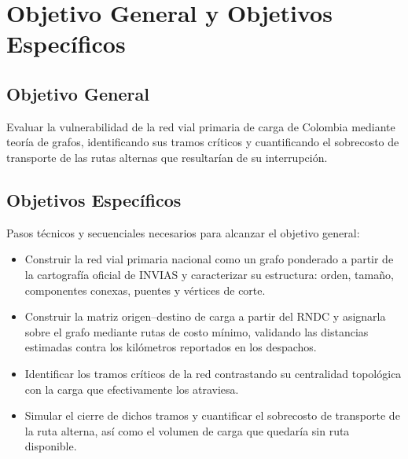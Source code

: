 \documentclass[conference]{IEEEtran}
\begin{document}
\section{Objetivo General y Objetivos Específicos}
\label{sec:objetivos}
\subsection{Objetivo General}
Evaluar la vulnerabilidad de la red vial primaria de carga de Colombia mediante
teoría de grafos, identificando sus tramos críticos y cuantificando el
sobrecosto de transporte de las rutas alternas que resultarían de su
interrupción.

\subsection{Objetivos Específicos}
Pasos técnicos y secuenciales necesarios para alcanzar el objetivo general:
\begin{itemize}
    \item Construir la red vial primaria nacional como un grafo ponderado a
    partir de la cartografía oficial de INVIAS y caracterizar su estructura:
    orden, tamaño, componentes conexas, puentes y vértices de corte.
 
    \item Construir la matriz origen--destino de carga a partir del RNDC y
    asignarla sobre el grafo mediante rutas de costo mínimo, validando las
    distancias estimadas contra los kilómetros reportados en los despachos.
 
    \item Identificar los tramos críticos de la red contrastando su
    centralidad topológica con la carga que efectivamente los atraviesa.
 
    \item Simular el cierre de dichos tramos y cuantificar el sobrecosto de
    transporte de la ruta alterna, así como el volumen de carga que quedaría sin
    ruta disponible.
\end{itemize}

\end{document}
